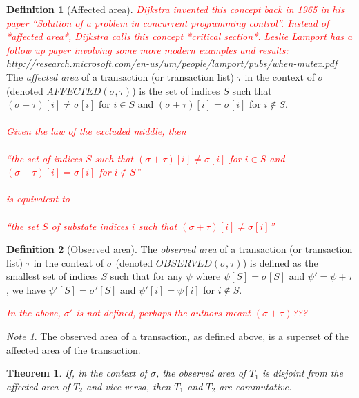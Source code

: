 \documentclass[11pt,a4paper]{report}
\newcommand{\comment}[1]{\textcolor{red}{\textit{#1}}}
\theoremstyle{plain}
\newtheorem{thm}{Theorem}[section]
\theoremstyle{definition}
\newtheorem{defn}{Definition}[chapter]
\theoremstyle{remark}
\newtheorem*{note}{Note}
\begin{document}
\begin{defn}[Affected area]
\comment{Dijkstra invented this concept back in 1965 in his paper ``Solution of a problem in concurrent programming control''.  Instead of *affected area*, Dijkstra calls this concept *critical section*. Leslie Lamport has a follow up paper involving some more modern examples and results: \url{http://research.microsoft.com/en-us/um/people/lamport/pubs/when-mutex.pdf}\\}
The \emph{affected area} of a transaction (or transaction list) $\tau$ in the context of $\sigma$ (denoted $AFFECTED(\sigma, \tau)$) is the set of indices $S$ such that $(\sigma + \tau)[i] \ne \sigma[i]$ for $i \in S$ and $(\sigma + \tau)[i] = \sigma[i]$ for $i \notin S$.
\comment{\\
\\
Given the law of the excluded middle, then\\
\\
``the set of indices $S$ such that $(\sigma + \tau)[i] \ne \sigma[i]$ for $i \in S$ and $(\sigma + \tau)[i] = \sigma[i]$ for $i \notin S$''\\
 \\
 is equivalent to\\
 \\
 ``the set $S$ of substate indices $i$ such that $(\sigma + \tau)[i] \neq \sigma[i]$''
}

\end{defn}

\begin{defn}[Observed area]
The \emph{observed area} of a transaction (or transaction list) $\tau$ in the context of $\sigma$ (denoted $OBSERVED(\sigma, \tau)$) is defined as the smallest set of indices $S$ such that for any $\psi$ where $\psi[S] = \sigma[S]$ and $\psi' = \psi + \tau$, we have $\psi'[S] = \sigma'[S]$ and $\psi'[i] = \psi[i]$ for $i \notin S$. 
\end{defn}

\comment{In the above, $\sigma'$ is not defined, perhaps the authors meant $(\sigma + \tau)$???}

\begin{note}
The observed area of a transaction, as defined above, is a superset of the affected area of the transaction.
\end{note}

\begin{thm}
If, in the context of $\sigma$, the observed area of $T_1$ is disjoint from the affected area of $T_2$ and vice versa, then $T_1$ and $T_2$ are commutative.
\end{thm}
\end{document}

